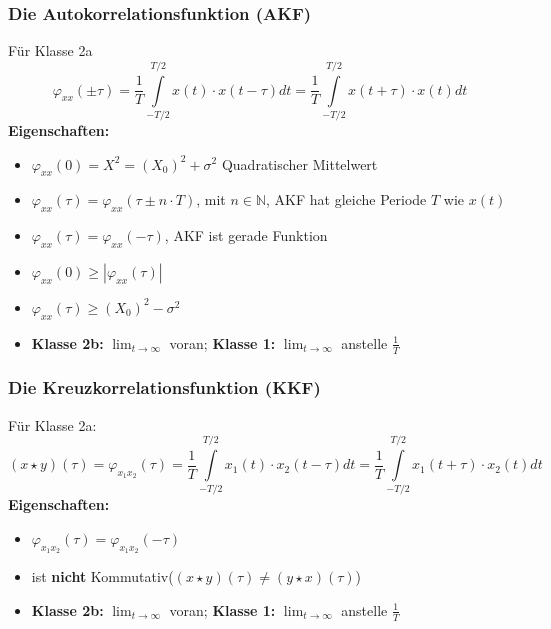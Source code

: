 \subsubsection*{Die Autokorrelationsfunktion (AKF)}
Für Klasse 2a
$$ \varphi_{xx}(\pm \tau) = \frac{1}{T} \int \limits _{-T/2} ^{T/2} x(t) \cdot x(t- \tau) dt
  = \frac{1}{T} \int \limits _{-T/2} ^{T/2} x(t + \tau) \cdot x(t)dt$$
\textbf{Eigenschaften:}
\begin{itemize}
  \item $\varphi_{xx}(0) = X^2 = (X_0)^2 + \sigma^2$ \tiny Quadratischer Mittelwert \normalsize
  \item $\varphi_{xx}(\tau) = \varphi_{xx}(\tau \pm n \cdot T)$, mit $n \in \mathbb{N}$,
        AKF hat gleiche Periode $T$ wie $x(t)$
  \item $\varphi_{xx}(\tau) = \varphi_{xx}(-\tau)$, AKF ist gerade Funktion
  \item $\varphi_{xx}(0) \geq \left|\varphi_{xx}(\tau)\right|$
  \item $\varphi_{xx}(\tau) \geq (X_0)^2 - \sigma^2$
  \item \textbf{Klasse 2b:} $\lim_{t \to \infty}$ voran; \textbf{Klasse 1:} $\lim_{t \to \infty}$ anstelle $\frac{1}{T}$
\end{itemize}

\subsubsection*{Die Kreuzkorrelationsfunktion (KKF)}
Für Klasse 2a:
$$ (x \star y)(\tau) = \varphi_{x_1x_2}(\tau) = \frac{1}{T} \int \limits _{-T/2} ^{T/2} x_1(t) \cdot x_2(t- \tau) dt
  = \frac{1}{T} \int \limits _{-T/2} ^{T/2} x_1(t + \tau) \cdot x_2(t)dt$$
\textbf{Eigenschaften:}
\begin{itemize}
  \item  $\varphi_{x_1x_2}(\tau) = \varphi_{x_1x_2}(-\tau)$
  \item ist \textbf{nicht} Kommutativ($(x \star y)(\tau) \neq (y \star x)(\tau)$)
  \item \textbf{Klasse 2b:} $\lim_{t \to \infty}$ voran; \textbf{Klasse 1:} $\lim_{t \to \infty}$ anstelle $\frac{1}{T}$
\end{itemize}


